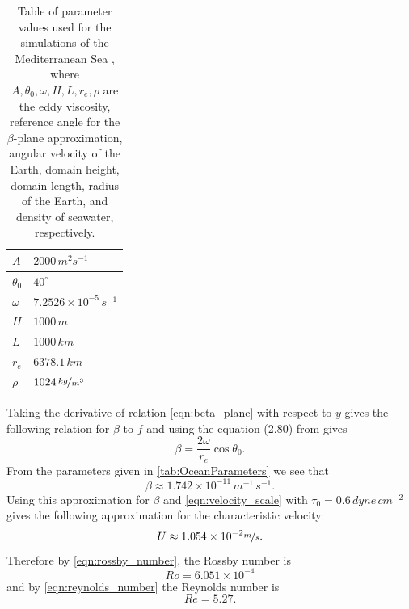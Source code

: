 \begin{table}
  \begin{center}
  \begin{tabular}{|l|l|}
    \hline
    $A$ & $2000\,m^2s^{-1}$\\
    \hline
    $\theta_0$ & $40^\circ$ \\
    \hline
    $\omega$ & $7.2526\times 10^{-5}\,s^{-1}$ \\
    \hline
    $H$ & $1000\,m$ \\
    \hline
    $L$ & $1000\,km$ \\
    \hline
    $r_e$ & $6378.1\,km$ \\
    \hline
    $\rho$ & $1024\, \nicefrac{kg}{m^3}$ \\
    \hline
  \end{tabular}
  \end{center}
  \caption{Table of parameter values used for the simulations of the
    Mediterranean Sea \cite{delSastre04}, where $A,\theta_0,\omega,H,L,r_e,\rho$ are the
    eddy viscosity, reference angle for the $\beta$-plane approximation, angular
    velocity of the Earth, domain height, domain length, radius of the Earth, and
    density of seawater, respectively.}
  \label{tab:OceanParameters}
\end{table}

Taking the derivative of relation \eqref{eqn:beta_plane} with respect to $y$
gives the following relation for $\beta$ to $f$ and using the equation (2.80)
from \cite{Vallis06} gives
\begin{equation}
  \beta = \frac{2\omega}{r_e}\cos \theta_0.
  \label{eqn:Beta}
\end{equation}
From the parameters given in \autoref{tab:OceanParameters} we see that
\begin{equation*}
  \beta \approx 1.742\times 10^{-11}\, m^{-1}\,s^{-1}.
\end{equation*}
Using this approximation for $\beta$ and \eqref{eqn:velocity_scale} with
$\tau_0 = 0.6\, dyne\, cm^{-2}$ \cite{Hellerman} gives the following
approximation for the characteristic velocity:
\begin{equation*}
    U \approx 1.054\times 10^{-2} \nicefrac{m}{s}.
\end{equation*}
Therefore by \eqref{eqn:rossby_number}, the Rossby number is
\begin{equation*}
  Ro = 6.051\times 10^{-4}
\end{equation*}
and by \eqref{eqn:reynolds_number} the Reynolds number is
\begin{equation*}
  Re = 5.27.
\end{equation*}

